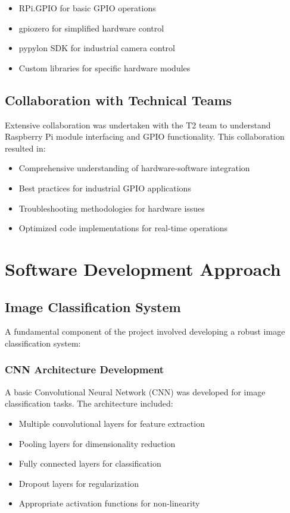 \documentclass{book}
\begin{document}
\begin{itemize}
\item RPi.GPIO for basic GPIO operations
\item gpiozero for simplified hardware control
\item pypylon SDK for industrial camera control
\item Custom libraries for specific hardware modules
\end{itemize}

\subsection{Collaboration with Technical Teams}
\par\noindent Extensive collaboration was undertaken with the T2 team to understand Raspberry Pi module interfacing and GPIO functionality. This collaboration resulted in:

\begin{itemize}
\item Comprehensive understanding of hardware-software integration
\item Best practices for industrial GPIO applications
\item Troubleshooting methodologies for hardware issues
\item Optimized code implementations for real-time operations
\end{itemize}

\section{Software Development Approach}

\subsection{Image Classification System}
\par\noindent A fundamental component of the project involved developing a robust image classification system:

\subsubsection{CNN Architecture Development}
\par\noindent A basic Convolutional Neural Network (CNN) was developed for image classification tasks. The architecture included:

\begin{itemize}
\item Multiple convolutional layers for feature extraction
\item Pooling layers for dimensionality reduction
\item Fully connected layers for classification
\item Dropout layers for regularization
\item Appropriate activation functions for non-linearity
\end{itemize}
\end{document}
